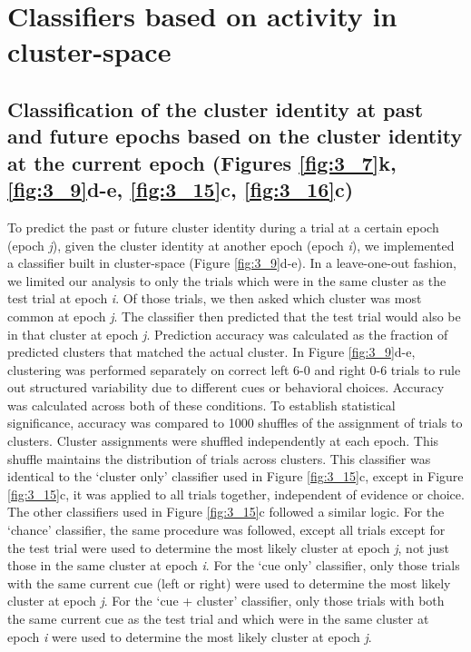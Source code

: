 \section{Classifiers based on activity in cluster-space} \label{methods:clustering_classifiers}

\subsection[Classification of the cluster identity at past and future epochs based on the cluster identity at the current epoch]{Classification of the cluster identity at past and future epochs based on the cluster identity at the current epoch (Figures \ref{fig:3_7}k, \ref{fig:3_9}d-e, \ref{fig:3_15}c, \ref{fig:3_16}c)} \label{methods:clustering_past_future_class}

To predict the past or future cluster identity during a trial at a certain epoch (epoch \textit{j}), given the cluster identity at another epoch (epoch \textit{i}), we implemented a classifier built in cluster-space (Figure \ref{fig:3_9}d-e). In a leave-one-out fashion, we limited our analysis to only the trials which were in the same cluster as the test trial at epoch \textit{i}. Of those trials, we then asked which cluster was most common at epoch \textit{j}. The classifier then predicted that the test trial would also be in that cluster at epoch \textit{j}. Prediction accuracy was calculated as the fraction of predicted clusters that matched the actual cluster. In Figure \ref{fig:3_9}d-e, clustering was performed separately on correct left 6-0 and right 0-6 trials to rule out structured variability due to different cues or behavioral choices. Accuracy was calculated across both of these conditions. To establish statistical significance, accuracy was compared to 1000 shuffles of the assignment of trials to clusters. Cluster assignments were shuffled independently at each epoch. This shuffle maintains the distribution of trials across clusters. This classifier was identical to the `cluster only' classifier used in Figure \ref{fig:3_15}c, except in Figure \ref{fig:3_15}c, it was applied to all trials together, independent of evidence or choice. The other classifiers used in Figure \ref{fig:3_15}c followed a similar logic. For the `chance' classifier, the same procedure was followed, except all trials except for the test trial were used to determine the most likely cluster at epoch \textit{j}, not just those in the same cluster at epoch \textit{i}. For the `cue only' classifier, only those trials with the same current cue (left or right) were used to determine the most likely cluster at epoch \textit{j}. For the `cue + cluster' classifier, only those trials with both the same current cue as the test trial and which were in the same cluster at epoch \textit{i} were used to determine the most likely cluster at epoch \textit{j}. 


